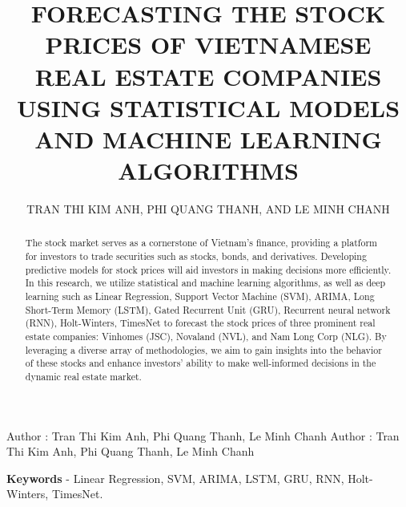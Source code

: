 \documentclass{ieeeojies}
\begin{document}
\title{FORECASTING THE STOCK PRICES OF VIETNAMESE REAL ESTATE COMPANIES USING STATISTICAL MODELS AND MACHINE LEARNING ALGORITHMS}

\author{\uppercase{Tran Thi Kim Anh},
\uppercase{Phi Quang Thanh, and Le Minh Chanh}}

\address[1]{Faculty of Information Systems, University of Information Technology, (e-mail: 21520596@gm.uit.edu.vn)}
\address[2]{Faculty of Information Systems, University of Information Technology, (e-mail: 21521449@gm.uit.edu.vn)}
\address[3]{Faculty of Information Systems, University of Information Technology, (e-mail: 21521882@gm.uit.edu.vn)}

\markboth
{Author \headeretal: Tran Thi Kim Anh, Phi Quang Thanh, Le Minh Chanh}
{Author \headeretal: Tran Thi Kim Anh, Phi Quang Thanh, Le Minh Chanh}

\begin{abstract}
The stock market serves as a cornerstone of Vietnam's finance, providing a platform for investors to trade securities such as stocks, bonds, and derivatives. Developing predictive models for stock prices will aid investors in making decisions more efficiently. In this research, we utilize statistical and machine learning algorithms, as well as deep learning such as Linear Regression, Support Vector Machine (SVM), ARIMA, Long Short-Term Memory (LSTM), Gated Recurrent Unit (GRU), Recurrent neural network (RNN), Holt-Winters, TimesNet to forecast the stock prices of three prominent real estate companies: Vinhomes (JSC), Novaland (NVL), and Nam Long Corp (NLG). By leveraging a diverse array of methodologies, we aim to gain insights into the behavior of these stocks and enhance investors' ability to make well-informed decisions in the dynamic real estate market.
\end{abstract}

\begin{keywords}
\textbf{Keywords} - Linear Regression, SVM, ARIMA, LSTM, GRU, RNN, Holt-Winters, TimesNet.
\end{keywords}

\titlepgskip=-15pt

\maketitle
\end{document}
